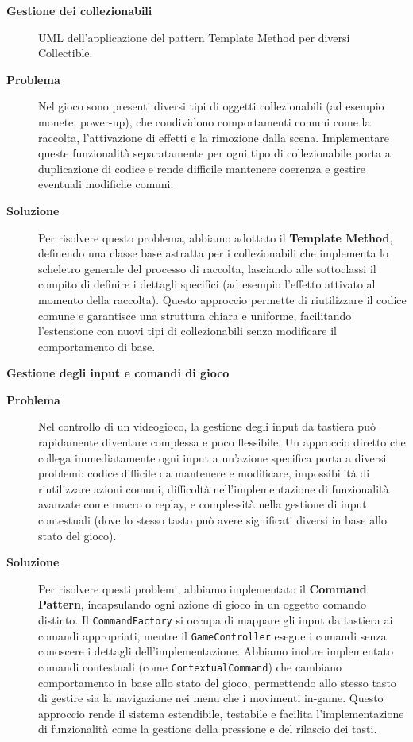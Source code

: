 \documentclass[a4paper,12pt]{report}
\begin{document}
\noindent
\textbf{Gestione dei collezionabili}
\begin{figure}[H]
	\centering{}
	
	\caption{UML dell'applicazione del pattern Template Method per diversi Collectible.}
	\label{img:collectible}
\end{figure}
\begin{description}
	\item[\textbf{Problema}]
	      Nel gioco sono presenti diversi tipi di oggetti collezionabili (ad esempio monete, power-up), che condividono comportamenti comuni come la raccolta, l'attivazione di effetti e la rimozione dalla
	      scena. Implementare queste funzionalità separatamente per ogni tipo di collezionabile porta a duplicazione di codice e rende difficile mantenere coerenza e gestire eventuali modifiche comuni.

	\item[\textbf{Soluzione}]
	      Per risolvere questo problema, abbiamo adottato il \textbf{Template Method}, definendo una classe base astratta per i collezionabili che implementa lo scheletro generale del processo di raccolta,
	      lasciando alle sottoclassi il compito di definire i dettagli specifici (ad esempio l'effetto attivato al momento della raccolta). Questo approccio permette di riutilizzare il codice comune e
	      garantisce una struttura chiara e uniforme, facilitando l'estensione con nuovi tipi di collezionabili senza modificare il comportamento di base.
\end{description}

\newpage
\noindent
\textbf{Gestione degli input e comandi di gioco}
\begin{description}
	\item[\textbf{Problema}]
	      Nel controllo di un videogioco, la gestione degli input da tastiera può rapidamente diventare complessa e poco flessibile. Un approccio diretto che collega immediatamente ogni input a un'azione
	      specifica porta a diversi problemi: codice difficile da mantenere e modificare, impossibilità di riutilizzare azioni comuni, difficoltà nell'implementazione di funzionalità avanzate come
	      macro o replay, e complessità nella gestione di input contestuali (dove lo stesso tasto può avere significati diversi in base allo stato del gioco).

	\item[\textbf{Soluzione}]
	      Per risolvere questi problemi, abbiamo implementato il \textbf{Command Pattern}, incapsulando ogni azione di gioco in un oggetto comando distinto. Il \texttt{CommandFactory} si occupa di
	      mappare gli input da tastiera ai comandi appropriati, mentre il \texttt{GameController} esegue i comandi senza conoscere i dettagli dell'implementazione. Abbiamo inoltre implementato comandi
	      contestuali (come \texttt{ContextualCommand}) che cambiano comportamento in base allo stato del gioco, permettendo allo stesso tasto di gestire sia la navigazione nei menu che i movimenti
	      in-game. Questo approccio rende il sistema estendibile, testabile e facilita l'implementazione di funzionalità come la gestione della pressione e del rilascio dei tasti.
\end{description}
\end{document}

